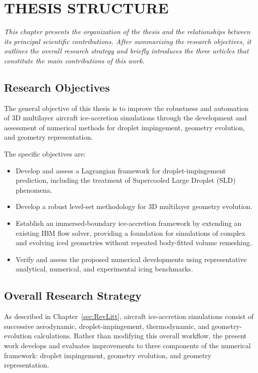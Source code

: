 \chapter{THESIS STRUCTURE}\label{sec:thesisStructure}

\textit{
This chapter presents the organization of the thesis and the relationships between its principal scientific contributions. After summarizing the research objectives, it outlines the overall research strategy and briefly introduces the three articles that constitute the main contributions of this work.
}

\section{Research Objectives}\label{sec:thesisSpecificObjectives}

The general objective of this thesis is to improve the robustness and automation of 3D multilayer aircraft ice-accretion simulations through the development and assessment of numerical methods for droplet impingement, geometry evolution, and geometry representation.

The specific objectives are:

\begin{itemize}
    \item Develop and assess a Lagrangian framework for droplet-impingement prediction, including the treatment of Supercooled Large Droplet (SLD) phenomena.

    \item Develop a robust level-set methodology for 3D multilayer geometry evolution.

    \item Establish an immersed-boundary ice-accretion framework by extending an existing IBM flow solver, providing a foundation for simulations of complex and evolving iced geometries without repeated body-fitted volume remeshing.

    \item Verify and assess the proposed numerical developments using representative analytical, numerical, and experimental icing benchmarks.
\end{itemize}

\section{Overall Research Strategy}\label{sec:thesisProposedSolution}

As described in Chapter~\ref{sec:RevLitt}, aircraft ice-accretion simulations consist of successive aerodynamic, droplet-impingement, thermodynamic, and geometry-evolution calculations. Rather than modifying this overall workflow, the present work develops and evaluates improvements to three components of the numerical framework: droplet impingement, geometry evolution, and geometry representation.

